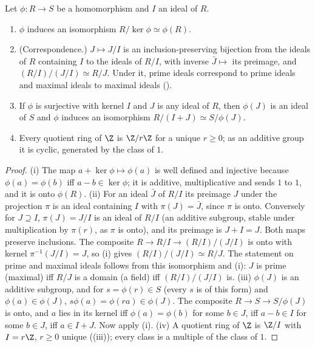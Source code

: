 \begin{theorem}\label{thm:rings:isomorphism}
Let $\phi\colon R\to S$ be a homomorphism and $I$ an ideal of $R$.
\begin{enumerate}[label=(\roman*)]
\item $\phi$ induces an isomorphism $R/\ker\phi\simeq\phi(R)$.
\item (Correspondence.) $J\mapsto J/I$ is an inclusion-preserving bijection from the ideals of $R$ containing $I$ to the
ideals of $R/I$, with inverse $\bar J\mapsto$ its preimage, and $(R/I)/(J/I)\simeq R/J$. Under it, prime ideals correspond to
prime ideals and maximal ideals to maximal ideals ().
\item If $\phi$ is surjective with kernel $I$ and $J$ is any ideal of $R$, then $\phi(J)$ is an ideal of $S$ and $\phi$ induces an
isomorphism $R/(I+J)\simeq S/\phi(J)$.
\item Every quotient ring of $\Z$ is $\Z/r\Z$ for a unique $r\ge0$; as an additive group it is cyclic, generated by the
class of $1$.
\end{enumerate}
\end{theorem}

\begin{proof}
(i) The map $a+\ker\phi\mapsto\phi(a)$ is well defined and injective because $\phi(a)=\phi(b)$ iff $a-b\in\ker\phi$; it is
additive, multiplicative and sends $1$ to $1$, and it is onto $\phi(R)$.
(ii) For an ideal $\bar J$ of $R/I$ its preimage $J$ under the projection $\pi$ is an ideal containing $I$ with $\pi(J)=\bar J$, since $\pi$ is
onto. Conversely for $J\supseteq I$, $\pi(J)=J/I$ is an ideal of $R/I$ (an additive subgroup, stable under multiplication by
$\pi(r)$, as $\pi$ is onto), and its preimage is $J+I=J$. Both maps preserve inclusions. The composite $R\to R/I\to(R/I)/(J/I)$ is
onto with kernel $\pi^{-1}(J/I)=J$, so (i) gives $(R/I)/(J/I)\simeq R/J$. The statement on prime and maximal ideals follows
from this isomorphism and (i): $J$ is prime (maximal) iff $R/J$ is a domain (a field) iff
$(R/I)/(J/I)$ is.
(iii) $\phi(J)$ is an additive subgroup, and for $s=\phi(r)\in S$ (every $s$ is of this form) and $\phi(a)\in\phi(J)$,
$s\phi(a)=\phi(ra)\in\phi(J)$. The composite $R\to S\to S/\phi(J)$ is onto, and $a$ lies in its kernel iff $\phi(a)=\phi(b)$ for some $b\in J$,
iff $a-b\in I$ for some $b\in J$, iff $a\in I+J$. Now apply (i).
(iv) A quotient ring of $\Z$ is $\Z/I$ with $I=r\Z$, $r\ge0$ unique ((iii)); every class is a multiple of the
class of $1$.
\end{proof}


